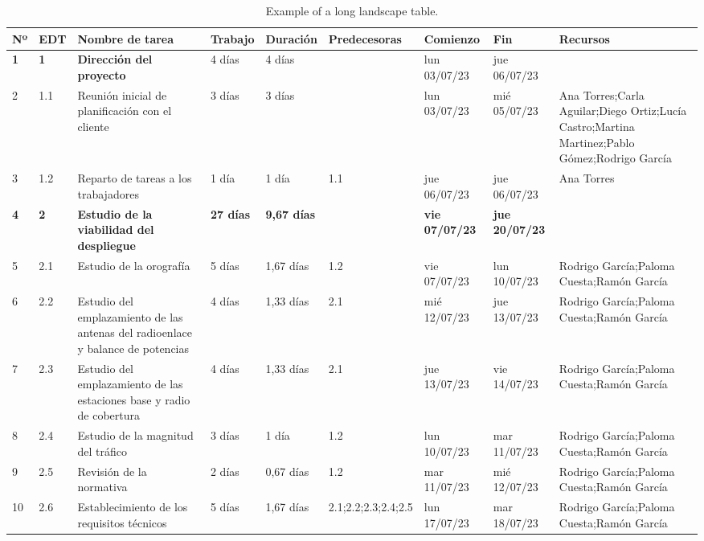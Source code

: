 \begin{landscape}
    \begin{table}[p]
    \scriptsize
    \centering
    \renewcommand{\arraystretch}{1.2}
    
    \caption{Example of a long landscape table.}
    \label{tab:predecesoras-1}
    \begin{tabular}{|l|l|p{5.5cm}|l|l|l|l|l|p{5.5cm}|}
    \hline
    \textbf{Nº} & \textbf{EDT} & \textbf{Nombre de tarea} & \textbf{Trabajo} & \textbf{Duración} & \textbf{Predecesoras} & \textbf{Comienzo} & \textbf{Fin} & \textbf{Recursos} \\ \hline\hline
    \textbf{1} & \textbf{1} & \textbf{Dirección del proyecto} & 4 días & 4 días &  & lun 03/07/23 & jue 06/07/23 &  \\ \hline
    2 & 1.1 & Reunión inicial de planificación con el cliente & 3 días & 3 días &  & lun 03/07/23 & mié 05/07/23 & Ana Torres;Carla Aguilar;Diego Ortiz;Lucía   Castro;Martina Martinez;Pablo Gómez;Rodrigo García \\ \hline
    3 & 1.2 & Reparto de tareas a los trabajadores & 1 día & 1 día & 1.1 & jue 06/07/23 & jue 06/07/23 & Ana Torres \\ \hline
    \textbf{4} & \textbf{2} & \textbf{Estudio de la viabilidad del despliegue} & \textbf{27 días} & \textbf{9,67 días} & \textbf{} & \textbf{vie 07/07/23} & \textbf{jue 20/07/23} & \textbf{} \\ \hline
    5 & 2.1 & Estudio de la orografía & 5 días & 1,67 días & 1.2 & vie 07/07/23 & lun 10/07/23 & Rodrigo García;Paloma Cuesta;Ramón García \\ \hline
    6 & 2.2 & Estudio del emplazamiento de las antenas del   radioenlace y balance de potencias & 4 días & 1,33 días & 2.1 & mié 12/07/23 & jue 13/07/23 & Rodrigo García;Paloma Cuesta;Ramón García \\ \hline
    7 & 2.3 & Estudio del emplazamiento de las estaciones   base y radio de cobertura & 4 días & 1,33 días & 2.1 & jue 13/07/23 & vie 14/07/23 & Rodrigo García;Paloma Cuesta;Ramón García \\ \hline
    8 & 2.4 & Estudio de la magnitud del tráfico & 3 días & 1 día & 1.2 & lun 10/07/23 & mar 11/07/23 & Rodrigo García;Paloma Cuesta;Ramón García \\ \hline
    9 & 2.5 & Revisión de la normativa & 2 días & 0,67 días & 1.2 & mar 11/07/23 & mié 12/07/23 & Rodrigo García;Paloma Cuesta;Ramón García \\ \hline
    10 & 2.6 & Establecimiento de los requisitos técnicos & 5 días & 1,67 días & 2.1;2.2;2.3;2.4;2.5 & lun 17/07/23 & mar 18/07/23 & Rodrigo García;Paloma Cuesta;Ramón García \\ \hline

\end{tabular}
\end{table}
\end{landscape}
